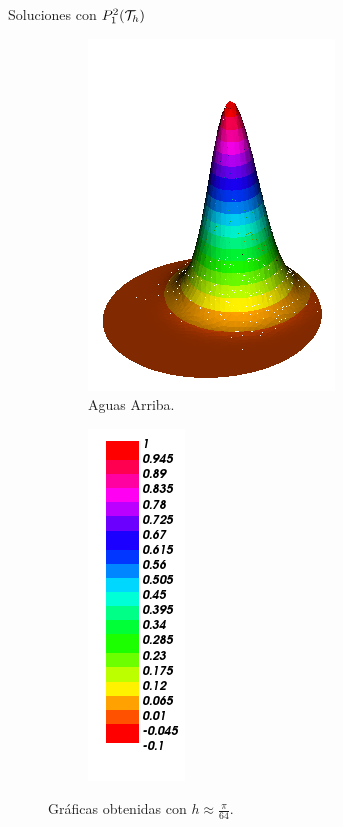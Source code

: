 \begin{frame}{Soluciones con $\relax{P}_1^2(\mathcal{T}_h)$}
\begin{figure}[h!]
\begin{subfigure}[b]{0.27\textwidth}
				\centering
				\includegraphics[scale=0.22]{img/Conveccion_Reaccion/Recortes/steady_convect_react_approx_UPW_n_128.png}
				\caption{Aguas Arriba.}
			\end{subfigure}
			\begin{subfigure}[b]{0.15\textwidth}
				\centering
				\includegraphics[scale=0.22]{img/Conveccion_Reaccion/Recortes/steady_convect_react_values.png}
			\end{subfigure}
			\caption{Gráficas obtenidas con $h\approx\frac{\pi}{64}$.}
		\end{figure}
		\vspace{-0.7cm}
		\begin{figure}[h!]
			\begin{subfigure}[b]{0.27\textwidth}
				\centering

\end{subfigure}
\end{figure}
\end{frame}
